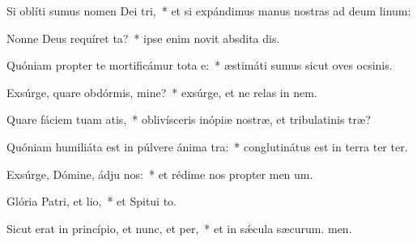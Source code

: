 \item Si oblíti sumus nomen Dei tri,~* et si expándimus manus nostras ad deum linum:
\item Nonne Deus requíret ta?~* ipse enim novit absdita dis.
\item Quóniam propter te mortificámur tota e:~* æstimáti sumus sicut oves ocsinis.
\item Exsúrge, quare obdórmis, mine?~* exsúrge, et ne relas in nem.
\item Quare fáciem tuam atis,~* oblivísceris inópiæ nostræ, et tribulatinis træ?
\item Quóniam humiliáta est in púlvere ánima tra:~* conglutinátus est in terra ter ter.
\item Exsúrge, Dómine, ádju nos:~* et rédime nos propter men um.
\item Glória Patri, et lio,~* et Spitui to.
\item Sicut erat in princípio, et nunc, et per,~* et in sǽcula sæcurum. men.
